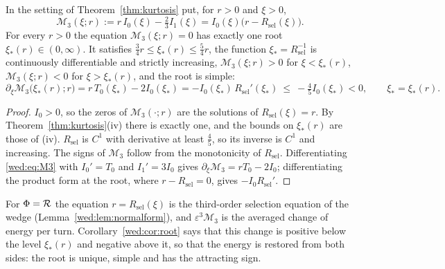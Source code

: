\begin{corollary}\label{wed:cor:root}
In the setting of Theorem~\ref{thm:kurtosis} put, for $r>0$ and $\xi>0$,
\begin{equation}\label{wed:eq:M3}
\mathcal M_3(\xi;r):=r\,I_0(\xi)-\tfrac23I_1(\xi)=I_0(\xi)\bigl(r-R_{\mathrm{sel}}(\xi)\bigr).
\end{equation}
For every $r>0$ the equation $\mathcal M_3(\xi;r)=0$ has exactly one root $\xi_*(r)\in(0,\infty)$. It satisfies $\tfrac34r\le\xi_*(r)\le\tfrac54r$, the function $\xi_*=R_{\mathrm{sel}}^{-1}$ is continuously differentiable and strictly increasing, $\mathcal M_3(\xi;r)>0$ for $\xi<\xi_*(r)$, $\mathcal M_3(\xi;r)<0$ for $\xi>\xi_*(r)$, and the root is simple:
\begin{equation}\label{wed:eq:M3slope}
\partial_\xi\mathcal M_3\bigl(\xi_*(r);r\bigr)=r\,T_0(\xi_*)-2I_0(\xi_*)=-I_0(\xi_*)\,R_{\mathrm{sel}}'(\xi_*)\ \le\ -\tfrac45I_0(\xi_*)<0,\qquad \xi_*=\xi_*(r).
\end{equation}
\end{corollary}
\begin{proof}
$I_0>0$, so the zeros of $\mathcal M_3(\cdot;r)$ are the solutions of $R_{\mathrm{sel}}(\xi)=r$. By Theorem~\ref{thm:kurtosis}(iv) there is exactly one, and the bounds on $\xi_*(r)$ are those of (iv). $R_{\mathrm{sel}}$ is $C^1$ with derivative at least $\tfrac45$, so its inverse is $C^1$ and increasing. The signs of $\mathcal M_3$ follow from the monotonicity of $R_{\mathrm{sel}}$. Differentiating \eqref{wed:eq:M3} with $I_0'=T_0$ and $I_1'=3I_0$ gives $\partial_\xi\mathcal M_3=rT_0-2I_0$; differentiating the product form at the root, where $r-R_{\mathrm{sel}}=0$, gives $-I_0R_{\mathrm{sel}}'$.
\end{proof}
For $\Phi=\mathcal R$ the equation $r=R_{\mathrm{sel}}(\xi)$ is the third-order selection equation of the wedge (Lemma~\ref{wed:lem:normalform}), and $\varepsilon^3\mathcal M_3$ is the averaged change of energy per turn. Corollary~\ref{wed:cor:root} says that this change is positive below the level $\xi_*(r)$ and negative above it, so that the energy is restored from both sides: the root is unique, simple and has the attracting sign.


